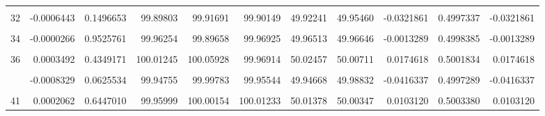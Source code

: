 \documentclass[a4paper]{tufte-handout}
\begin{document}
\begin{table}
{\begin{tabular}[t]{rrrrrrrrrrr}
\cellcolor{gray!6}{31} & \cellcolor{gray!6}{-0.0002466} & \cellcolor{gray!6}{0.5813051} & \cellcolor{gray!6}{100.01894} & \cellcolor{gray!6}{100.03143} & \cellcolor{gray!6}{100.01167} & \cellcolor{gray!6}{49.99844} & \cellcolor{gray!6}{50.01078} & \cellcolor{gray!6}{-0.0123341} & \cellcolor{gray!6}{0.4998897} & \cellcolor{gray!6}{-0.0123341}\\
32 & -0.0006443 & 0.1496653 & 99.89803 & 99.91691 & 99.90149 & 49.92241 & 49.95460 & -0.0321861 & 0.4997337 & -0.0321861\\
\addlinespace
\cellcolor{gray!6}{33} & \cellcolor{gray!6}{-0.0001251} & \cellcolor{gray!6}{0.7797496} & \cellcolor{gray!6}{100.01071} & \cellcolor{gray!6}{99.98714} & \cellcolor{gray!6}{100.11296} & \cellcolor{gray!6}{50.01877} & \cellcolor{gray!6}{50.02502} & \cellcolor{gray!6}{-0.0062562} & \cellcolor{gray!6}{0.5001341} & \cellcolor{gray!6}{-0.0062562}\\
34 & -0.0000266 & 0.9525761 & 99.96254 & 99.89658 & 99.96925 & 49.96513 & 49.96646 & -0.0013289 & 0.4998385 & -0.0013289\\
\cellcolor{gray!6}{35} & \cellcolor{gray!6}{-0.0000921} & \cellcolor{gray!6}{0.8368399} & \cellcolor{gray!6}{99.92419} & \cellcolor{gray!6}{99.87316} & \cellcolor{gray!6}{99.96447} & \cellcolor{gray!6}{49.95481} & \cellcolor{gray!6}{49.95941} & \cellcolor{gray!6}{-0.0046012} & \cellcolor{gray!6}{0.4999271} & \cellcolor{gray!6}{-0.0046012}\\
36 & 0.0003492 & 0.4349171 & 100.01245 & 100.05928 & 99.96914 & 50.02457 & 50.00711 & 0.0174618 & 0.5001834 & 0.0174618\\
\cellcolor{gray!6}{38} & \cellcolor{gray!6}{-0.0006341} & \cellcolor{gray!6}{0.1562326} & \cellcolor{gray!6}{99.96110} & \cellcolor{gray!6}{100.07149} & \cellcolor{gray!6}{99.82457} & \cellcolor{gray!6}{49.94233} & \cellcolor{gray!6}{49.97401} & \cellcolor{gray!6}{-0.0316877} & \cellcolor{gray!6}{0.4996176} & \cellcolor{gray!6}{-0.0316877}\\
\addlinespace
39 & -0.0008329 & 0.0625534 & 99.94755 & 99.99783 & 99.95544 & 49.94668 & 49.98832 & -0.0416337 & 0.4997289 & -0.0416337\\
\cellcolor{gray!6}{40} & \cellcolor{gray!6}{0.0003846} & \cellcolor{gray!6}{0.3897481} & \cellcolor{gray!6}{100.00907} & \cellcolor{gray!6}{99.92099} & \cellcolor{gray!6}{100.02583} & \cellcolor{gray!6}{50.00593} & \cellcolor{gray!6}{49.98670} & \cellcolor{gray!6}{0.0192267} & \cellcolor{gray!6}{0.5000140} & \cellcolor{gray!6}{0.0192267}\\
41 & 0.0002062 & 0.6447010 & 99.95999 & 100.00154 & 100.01233 & 50.01378 & 50.00347 & 0.0103120 & 0.5003380 & 0.0103120\\

\end{tabular}}
\end{table}
\end{document}
